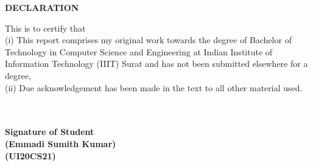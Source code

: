 \thispagestyle{plain}
\normalsize

\begin{center}
{\Large {\bf \uppercase{Declaration}}}
\end{center}

\vspace{\baselineskip}
\justify
\indent
This is to certify that \\
\noindent(i) This report comprises my original work towards the degree of Bachelor of Technology in Computer Science and Engineering at Indian Institute of Information Technology (IIIT) Surat and has not been submitted elsewhere for a degree,  \\
\noindent(ii) Due acknowledgement has been made in the text to all other material used.

\justify

\begin{minipage}{\textwidth}
\begin{flushright} 


{\small \bf \textcolor{white}{}}\\
{\small \bf \textcolor{white}{}}\\
{\small \bf Signature of Student} \\
{\small \bf (Emmadi Sumith Kumar)}\\
{\small \bf (UI20CS21)}\\[0.65cm]
\end{flushright}
\end{minipage}
\newpage